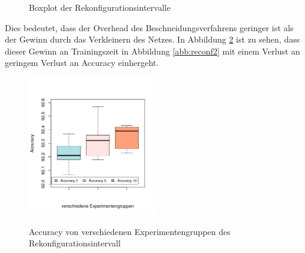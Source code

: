  \begin{figure}[h]
 \centering
 \qquad
 \caption{Boxplot der Rekonfigurationsintervalle}
 \label{abb:reconf}
\end{figure}

 Dies bedeutet, dass der Overhead des Beschneidungsverfahrens geringer ist als der Gewinn durch das Verkleinern des Netzes. In Abbildung \ref{abb:reconf3} ist zu sehen, dass dieser Gewinn an Trainingszeit in Abbildung \ref{abb:reconf2} mit einem Verlust an geringem Verlust an Accuracy einhergeht.  

 
 \begin{figure}[h]
 \centering
 \includegraphics[width=0.5\textwidth]{KapitelPartB/Images/reconf3.png}
 \label{abb:reconf3}
 \caption{Accuracy von verschiedenen Experimentengruppen des Rekonfigurationsintervall}
\end{figure}

